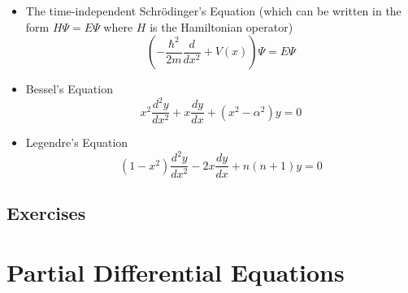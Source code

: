 \documentclass{report}
\theoremstyle{definition}
\theoremstyle{remark}
\newcommand{\od}[2]{\frac{d #1}{d#2}}
\newcommand{\odt}[2]{\frac{d^2 #1}{d#2^2}}
\begin{document}
\begin{itemize}
    \item The time-independent Schr\"odinger's Equation (which can be written in the form $H\Psi = E\Psi$ where $H$ is the Hamiltonian operator)
    \begin{equation*}
        \left(-\frac{\hbar^2}{2m} \od{}{x^2}+V(x)\right)\Psi = E\Psi
    \end{equation*}
    \item Bessel's Equation 
    \begin{equation*}
        x^2\odt{y}{x}+x\od{y}{x}+(x^2-\alpha^2)y=0
    \end{equation*}
    \item Legendre's Equation 
    \begin{equation*}
        (1-x^2)\odt{y}{x}-2x\od{y}{x}+n(n+1)y=0
    \end{equation*}
\end{itemize}

\section{Exercises}


\chapter{Partial Differential Equations}
\end{document}
